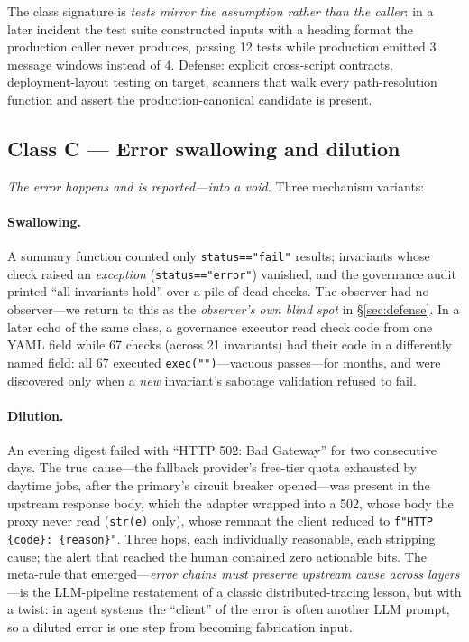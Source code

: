 The class signature is \emph{tests mirror the assumption rather than the
caller}: in a later incident the test suite constructed inputs with a
heading format the production caller never produces, passing 12 tests
while production emitted 3 message windows instead of 4. Defense:
explicit cross-script contracts, deployment-layout testing on target,
scanners that walk every path-resolution function and assert the
production-canonical candidate is present.

\subsection{Class C --- Error swallowing and dilution}\label{sec:classc}

\emph{The error happens and is reported---into a void.} Three mechanism
variants:

\paragraph{Swallowing.} A summary function counted only
\texttt{status=="fail"} results; invariants whose check raised an
\emph{exception} (\texttt{status=="error"}) vanished, and the governance
audit printed ``all invariants hold'' over a pile of dead checks. The
observer had no observer---we return to this as the \emph{observer's own
blind spot} in \S\ref{sec:defense}. In a later echo of the same class, a
governance executor read check code from one YAML field while 67 checks
(across 21 invariants) had their code in a differently named field: all
67 executed \texttt{exec("")}---vacuous passes---for months, and were
discovered only when a \emph{new} invariant's sabotage validation refused
to fail.

\paragraph{Dilution.} An evening digest failed with ``HTTP 502: Bad
Gateway'' for two consecutive days. The true cause---the fallback
provider's free-tier quota exhausted by daytime jobs, after the primary's
circuit breaker opened---was present in the upstream response body, which
the adapter wrapped into a 502, whose body the proxy never read
(\texttt{str(e)} only), whose remnant the client reduced to
\texttt{f"HTTP \{code\}: \{reason\}"}. Three hops, each individually
reasonable, each stripping cause; the alert that reached the human
contained zero actionable bits. The meta-rule that emerged---\emph{error
chains must preserve upstream cause across layers}---is the LLM-pipeline
restatement of a classic distributed-tracing lesson, but with a twist: in
agent systems the ``client'' of the error is often another LLM prompt, so
a diluted error is one step from becoming  fabrication input.

